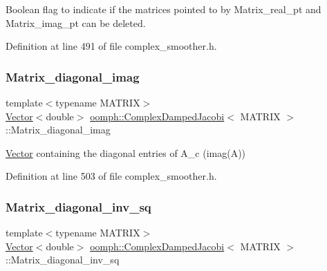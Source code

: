 Boolean flag to indicate if the matrices pointed to by Matrix\+\_\+real\+\_\+pt and Matrix\+\_\+imag\+\_\+pt can be deleted. 



Definition at line 491 of file complex\+\_\+smoother.\+h.

\mbox{\label{classoomph_1_1ComplexDampedJacobi_a68788038c7bd09732455662c5be2ab85}} 
\subsubsection{\texorpdfstring{Matrix\+\_\+diagonal\+\_\+imag}{Matrix\_diagonal\_imag}}
{\footnotesize\ttfamily template$<$typename M\+A\+T\+R\+IX$>$ \\
\hyperlink{classoomph_1_1Vector}{Vector}$<$double$>$ \hyperlink{classoomph_1_1ComplexDampedJacobi}{oomph\+::\+Complex\+Damped\+Jacobi}$<$ M\+A\+T\+R\+IX $>$\+::Matrix\+\_\+diagonal\+\_\+imag\hspace{0.3cm}{\ttfamily [private]}}



\hyperlink{classoomph_1_1Vector}{Vector} containing the diagonal entries of A\+\_\+c (imag(\+A)) 



Definition at line 503 of file complex\+\_\+smoother.\+h.

\mbox{\label{classoomph_1_1ComplexDampedJacobi_a5626c629f590cee327c045a333ca315d}} 
\subsubsection{\texorpdfstring{Matrix\+\_\+diagonal\+\_\+inv\+\_\+sq}{Matrix\_diagonal\_inv\_sq}}
{\footnotesize\ttfamily template$<$typename M\+A\+T\+R\+IX$>$ \\
\hyperlink{classoomph_1_1Vector}{Vector}$<$double$>$ \hyperlink{classoomph_1_1ComplexDampedJacobi}{oomph\+::\+Complex\+Damped\+Jacobi}$<$ M\+A\+T\+R\+IX $>$\+::Matrix\+\_\+diagonal\+\_\+inv\+\_\+sq\hspace{0.3cm}{\ttfamily [private]}}



